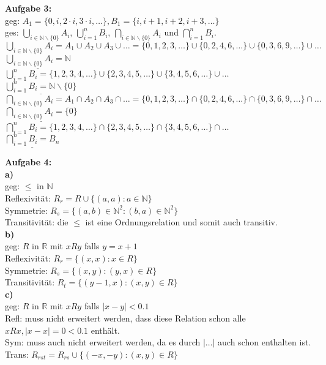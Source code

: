 \documentclass[a4paper]{scrartcl}
\begin{document}
	\begin{flushleft}
		\textbf{Aufgabe 3:}\\
		geg: $A_1=\{0,i,2\cdot i,3\cdot i, \dots\}, B_1=\{i,i+1,i+2,i+3, \dots\}$\\
		ges: $\underset{i\in \mathbb{N}\backslash \{0\}}{\bigcup} A_i$, $\bigcup^{n}_{i=1} B_i$, $\underset{i\in \mathbb{N}\backslash \{0\}}{\bigcap} A_i$ und $\bigcap^{n}_{i=1} B_i$. \\[1em]
		$\underset{i\in \mathbb{N}\backslash \{0\}}{\bigcup} A_i = A_1\cup A_2\cup A_3\cup\dots=\{0,1,2,3,\dots\}\cup\{0,2,4,6,\dots\}\cup\{0,3,6,9,\dots\}\cup\dots$\\
		$\underline{\underset{i\in \mathbb{N}\backslash \{0\}}{\bigcup} A_i = \mathbb{N}}$\\[1em]
		$\bigcup^{n}_{i=1} B_i = \{1,2,3,4,\dots\}\cup\{2,3,4,5,\dots\}\cup\{3,4,5,6,\dots\}\cup\dots$\\
		$\underline{\bigcup^{n}_{i=1} B_i = \mathbb{N}\backslash \{0\}}$\\[1em]
		$\underset{i\in \mathbb{N}\backslash \{0\}}{\bigcap} A_i = A_1\cap A_2\cap A_3\cap\dots=\{0,1,2,3,\dots\}\cap\{0,2,4,6,\dots\}\cap\{0,3,6,9,\dots\}\cap\dots$\\
		$\underline{\underset{i\in \mathbb{N}\backslash \{0\}}{\bigcap} A_i = \{0\}}$\\[1em]
		$\bigcap^{n}_{i=1} B_i = \{1,2,3,4,\dots\}\cap\{2,3,4,5,\dots\}\cap\{3,4,5,6,\dots\}\cap\dots$\\
		$\underline{\bigcap^{n}_{i=1} B_i = B_n}$\\[1em]
	\end{flushleft}
	\begin{flushleft}
		\textbf{Aufgabe 4:}\\
		\textbf{a)}\\
		geg: $\leq$ in $\mathbb{N}$\\
		Reflexivität: $R_r = R\cup \{(a,a):a \in \mathbb{N}\}$\\
		Symmetrie: $R_s=\{(a,b)\in\mathbb{N}^2:(b,a)\in\mathbb{N}^2\}$\\
		Transitivität: die $\leq$ ist eine Ordnungsrelation und somit auch transitiv.\\[1em]
		\textbf{b)}\\
		geg: $R$ in $\mathbb{R}$ mit $xRy$ falls $y=x+1$\\[1em]
		Reflexivität: $R_r=\{(x,x):x\in R\}$\\
		Symmetrie: $R_{s} = \{(x,y):(y,x)\in R\}$\\
		Transitivität: $R_{t} = \{(y-1,x):(x,y)\in R\}$\\[1em]
		\textbf{c)}\\
		geg: $R$ in $\mathbb{R}$ mit $xRy$ falls $|x-y|<0.1$\\[1em]
		Refl: muss nicht erweitert werden, dass diese Relation schon alle $xRx, |x-x|=0<0.1$ enthält.\\
		Sym: muss auch nicht erweitert werden, da es durch $|\dots|$ auch schon enthalten ist.\\
		Trans: $R_{rst}=R_{rs}\cup \{(-x,-y):(x,y)\in R\}$\\[1em]
		
	\end{flushleft}
\end{document}
